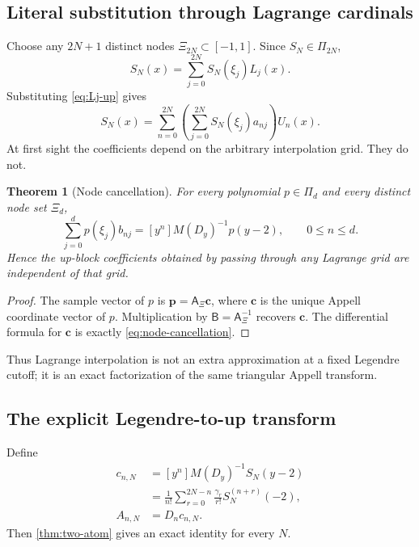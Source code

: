 \documentclass[11pt,oneside]{article}
\newtheorem{theorem}{Theorem}[section]
\theoremstyle{definition}
\theoremstyle{remark}
\begin{document}
\subsection{Literal substitution through Lagrange cardinals}
Choose any $2N+1$ distinct nodes
$\Xi_{2N}\subset[-1,1]$.  Since $S_N\in\Pi_{2N}$,
\begin{equation}
 S_N(x)=\sum_{j=0}^{2N}S_N(\xi_j)L_j(x).
 \label{eq:SN-Lagrange}
\end{equation}
Substituting \eqref{eq:Lj-up} gives
\begin{equation}
 S_N(x)=\sum_{n=0}^{2N}
 \left(\sum_{j=0}^{2N}S_N(\xi_j)a_{nj}\right)U_n(x).
 \label{eq:SN-via-Lagrange}
\end{equation}
At first sight the coefficients depend on the arbitrary interpolation grid.
They do not.

\begin{theorem}[Node cancellation]
\label{thm:node-cancellation}
For every polynomial $p\in\Pi_d$ and every distinct node set $\Xi_d$,
\begin{equation}
 \sum_{j=0}^{d}p(\xi_j)b_{nj}
 =[y^n]M(D_y)^{-1}p(y-2),
 \qquad0\le n\le d.
 \label{eq:node-cancellation}
\end{equation}
Hence the up-block coefficients obtained by passing through any Lagrange
grid are independent of that grid.
\end{theorem}

\begin{proof}
The sample vector of $p$ is $\bm p=\mathsf A_\Xi\bm c$, where $\bm c$ is
the unique Appell coordinate vector of $p$.  Multiplication by
$\mathsf B=\mathsf A_\Xi^{-1}$ recovers $\bm c$.  The differential formula
for $\bm c$ is exactly \eqref{eq:node-cancellation}.
\end{proof}

Thus Lagrange interpolation is not an extra approximation at a fixed
Legendre cutoff; it is an exact factorization of the same triangular
Appell transform.

\subsection{The explicit Legendre-to-up transform}
Define
\begin{align}
 c_{n,N}
 &=[y^n]M(D_y)^{-1}S_N(y-2)
 \label{eq:cnN-def}\\
 &=\frac1{n!}\sum_{r=0}^{2N-n}
 \frac{\gamma_r}{r!}S_N^{(n+r)}(-2),
 \label{eq:cnN-derivative}\\
 A_{n,N}&=D_nc_{n,N}.
 \label{eq:AnN-def}
\end{align}
Then \cref{thm:two-atom} gives an exact identity for every $N$.
\end{document}
